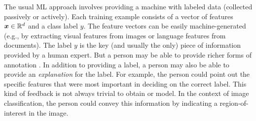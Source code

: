 The usual ML approach involves providing a machine with labeled data
(collected passively or actively).  Each training example consists of
a vector of features $\boldsymbol{x} \in {\mathbb R}^d$ and a class label $y$.  The
feature vectors can be easily machine-generated (e.g., by extracting
visual features from images or language features from documents).  The
label $y$ is the key (and usually the only) piece of information provided by a
human expert. But a person may be able to provide richer forms of
annotation \cite{raghavan2006active,druck2009active}. In addition to
providing a label, a person may also be able to provide an {\em
  explanation} for the label.  For example, the person could point out
the specific features that were most important in deciding on the correct
label. This kind of feedback is not always trivial to obtain or model. 
 In the context of image classification, the person could
convey this information by indicating a region-of-interest in the
image.